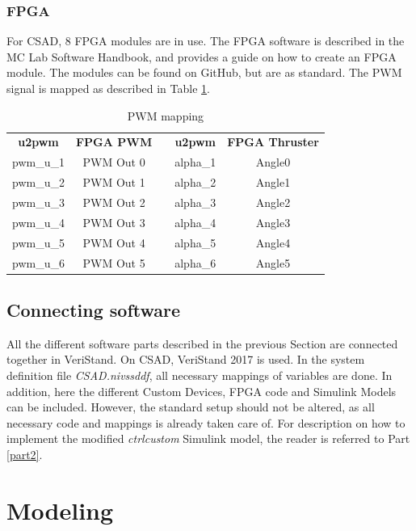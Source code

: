 \subsection{FPGA}
For CSAD, 8 FPGA modules are in use. The FPGA software is described in the MC Lab Software Handbook, and provides a guide on how to create an FPGA module. The modules can be found on GitHub, but are as standard. The PWM signal is mapped as described in Table \ref{tab:pwm_mapping}. 
\begin{table}[htb!]
	\centering
	\caption{PWM mapping}
	\label{tab:pwm_mapping}
	\begin{tabular}{|cc|c|cc|}
		\cline{1-2}\cline{4-5}
		\textbf{u2pwm} & \textbf{FPGA PWM} & \qquad \qquad \qquad & \textbf{u2pwm} & \textbf{FPGA Thruster} \\ \cline{1-2}\cline{4-5}
		pwm\_u\_1 & PWM Out 0 & & alpha\_1 & Angle0 \\
		pwm\_u\_2 & PWM Out 1 & & alpha\_2 & Angle1\\
		pwm\_u\_3 & PWM Out 2 & & alpha\_3 & Angle2\\
		pwm\_u\_4 & PWM Out 3 & & alpha\_4 & Angle3\\
		pwm\_u\_5 & PWM Out 4 & & alpha\_5 & Angle4\\
		pwm\_u\_6 & PWM Out 5 & & alpha\_6 & Angle5\\
		\cline{1-2}\cline{4-5}
	\end{tabular}
\end{table}


\section{Connecting software}
All the different software parts described in the previous Section are connected together in VeriStand. On CSAD, VeriStand 2017 is used. In the system definition file \textit{CSAD.nivssddf}, all necessary mappings of variables are done. In addition, here the different Custom Devices, FPGA code and Simulink Models can be included. However, the standard setup should not be altered, as all necessary code and mappings is already taken care of. For description on how to implement the modified \textit{ctrl\textunderscore custom} Simulink model, the reader is referred to Part \ref{part2}. 
\chapter{Modeling}
